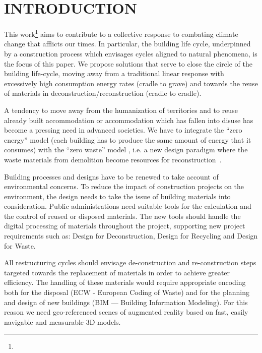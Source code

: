 \vspace{-2mm}
\section{\uppercase{Introduction}}
\label{sec:introduction}
\vspace{-2mm}


This work\footnote{\acks} aims to contribute to a collective response to combating climate change that afflicts our times. In particular, the building life cycle, underpinned by a construction process which envisages cycles aligned to natural phenomena, is the focus of this paper. We propose solutions that serve to close the circle of the building life-cycle, moving away from a traditional linear response with excessively high consumption energy rates (cradle to grave) and towards the reuse of materials in deconstruction/reconstruction (cradle to cradle).

A tendency to move away from the humanization of territories and to reuse already  built accommodation or accommodation which has fallen into disuse has become a pressing need in advanced societies. We have to integrate the ``zero energy'' model (each building has to produce the same amount of energy that it consumes) with the ``zero waste'' model , i.e. a new design paradigm where the waste materials from demolition become resources for reconstruction~\cite{altamura:12}.

Building processes and designs have to be renewed to take account of environmental concerns. To reduce the impact of construction projects on the environment, the design needs to take the issue of building materials into consideration. Public administrations need suitable tools for the calculation and the control of reused or disposed materials. The new tools should handle the digital processing of materials throughout the project, supporting new project requirements such as: Design for Deconstruction, Design for Recycling and Design for Waste.

All restructuring cycles should envisage de-construction and re-construction steps targeted towards the replacement of materials in order to achieve greater efficiency. The handling of these materials would require appropriate encoding both for the disposal (ECW - European Coding of Waste) and for the planning and design of new buildings (BIM --- Building Information Modeling). For this reason we need geo-referenced scenes of augmented reality based on fast, easily navigable and measurable 3D models. 

